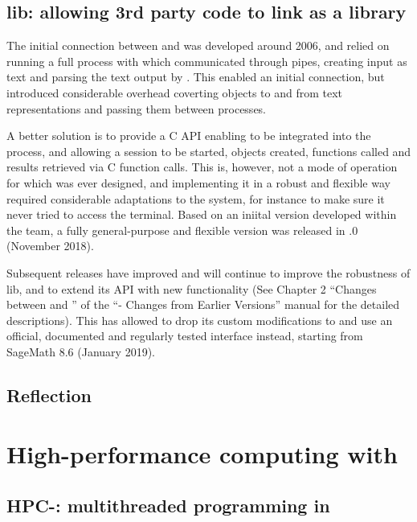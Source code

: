 \documentclass{deliverablereport}
\begin{document}
\subsection{lib\GAP: allowing 3rd party code to link \GAP as a library}\label{libgap}

The initial connection between \Sage and \GAP was developed around
2006, and relied on running a full \GAP process with which \Sage
communicated through pipes, creating \GAP input as text and parsing
the text output by \GAP. This enabled an initial connection, but
introduced considerable overhead coverting objects to and from text
representations and passing them between processes.

A better solution is to provide a C API enabling \GAP to be integrated
into the \Sage process, and allowing a \GAP session to be started,
objects created, functions called and results retrieved via C function
calls. This is, however, not a mode of operation for which \GAP was
ever designed, and implementing it in a robust and flexible way
required considerable adaptations to the system, for instance to make
sure it never tried to access the terminal. Based on an iniital
version developed within the \Sage team, a fully general-purpose and
flexible version was released in  .0 (November 2018).

Subsequent releases have improved and will continue to improve the
robustness of lib\GAP, and to extend its API with new functionality (See Chapter 2 
``Changes between  and '' of the 
``\GAP - Changes from Earlier Versions'' manual for the detailed
descriptions). This has allowed \Sage to drop its custom 
modifications to \GAP and use an official, documented and regularly 
tested \GAP interface instead, starting from SageMath 8.6 (January
2019).


\subsection{Reflection}\label{syntaxtree}

\section{High-performance computing with \GAP}\label{hpc}

\subsection{HPC-\GAP: multithreaded programming in \GAP}\label{hpc-gap}
\end{document}
